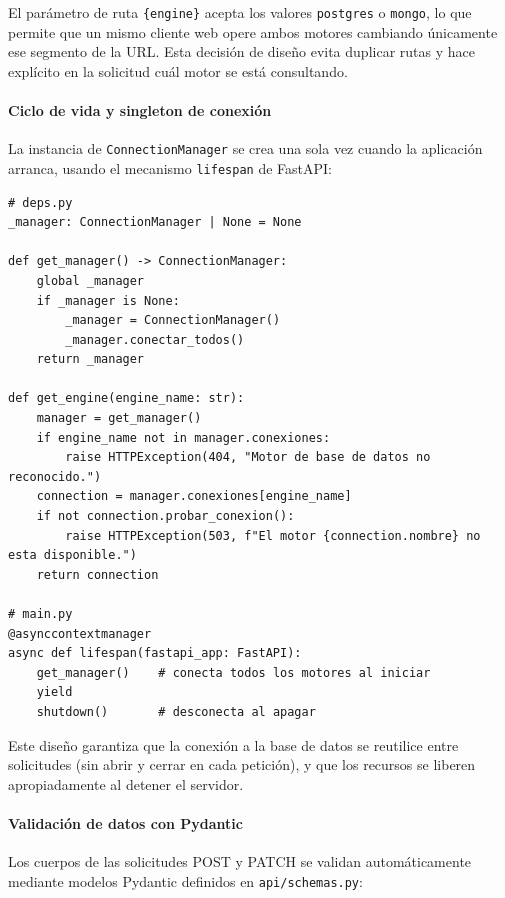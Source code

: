 \documentclass[12pt,letterpaper]{article}
\begin{document}
El parámetro de ruta \texttt{\{engine\}} acepta los valores \texttt{postgres} o \texttt{mongo},
lo que permite que un mismo cliente web opere ambos motores cambiando únicamente ese segmento
de la URL. Esta decisión de diseño evita duplicar rutas y hace explícito en la solicitud
cuál motor se está consultando.

\paragraph{Ciclo de vida y singleton de conexión}

La instancia de \texttt{ConnectionManager} se crea una sola vez cuando la aplicación arranca,
usando el mecanismo \texttt{lifespan} de FastAPI:

\begin{lstlisting}[style=pycode, caption={Gestión del ciclo de vida de la API (\texttt{api/main.py} y \texttt{api/deps.py})}]
# deps.py
_manager: ConnectionManager | None = None

def get_manager() -> ConnectionManager:
    global _manager
    if _manager is None:
        _manager = ConnectionManager()
        _manager.conectar_todos()
    return _manager

def get_engine(engine_name: str):
    manager = get_manager()
    if engine_name not in manager.conexiones:
        raise HTTPException(404, "Motor de base de datos no reconocido.")
    connection = manager.conexiones[engine_name]
    if not connection.probar_conexion():
        raise HTTPException(503, f"El motor {connection.nombre} no esta disponible.")
    return connection

# main.py
@asynccontextmanager
async def lifespan(fastapi_app: FastAPI):
    get_manager()    # conecta todos los motores al iniciar
    yield
    shutdown()       # desconecta al apagar
\end{lstlisting}

Este diseño garantiza que la conexión a la base de datos se reutilice entre solicitudes
(sin abrir y cerrar en cada petición), y que los recursos se liberen apropiadamente al detener
el servidor.

\paragraph{Validación de datos con Pydantic}

Los cuerpos de las solicitudes POST y PATCH se validan automáticamente mediante modelos
Pydantic definidos en \texttt{api/schemas.py}:
\end{document}
